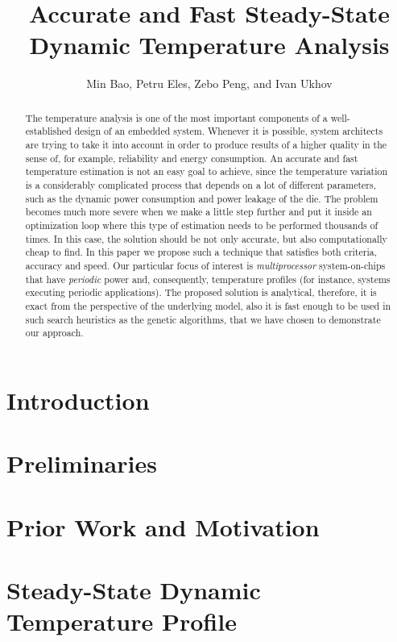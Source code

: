 \documentclass[conference]{IEEEtran}
\title{Accurate and Fast Steady-State\\Dynamic Temperature Analysis}
\author{Min Bao, Petru Eles, Zebo Peng, and Ivan Ukhov}
\begin{document}
  \maketitle

  \begin{abstract}
    The temperature analysis is one of the most important components of a well-established design of an embedded system. Whenever it is possible, system architects are trying to take it into account in order to produce results of a higher quality in the sense of, for example, reliability and energy consumption. An accurate and fast temperature estimation is not an easy goal to achieve, since the temperature variation is a considerably complicated process that depends on a lot of different parameters, such as the dynamic power consumption and power leakage of the die. The problem becomes much more severe when we make a little step further and put it inside an optimization loop where this type of estimation needs to be performed thousands of times. In this case, the solution should be not only accurate, but also computationally cheap to find. In this paper we propose such a technique that satisfies both criteria, accuracy and speed. Our particular focus of interest is \emph{multiprocessor} system-on-chips that have \emph{periodic} power and, consequently, temperature profiles (for instance, systems executing periodic applications). The proposed solution is analytical, therefore, it is exact from the perspective of the underlying model, also it is fast enough to be used in such search heuristics as the genetic algorithms, that we have chosen to demonstrate our approach.

  \end{abstract}

  \section{Introduction}
  

  \section{Preliminaries}
  

  \section{Prior Work and Motivation}
  

  \section{Steady-State Dynamic Temperature Profile}
  
\end{document}
